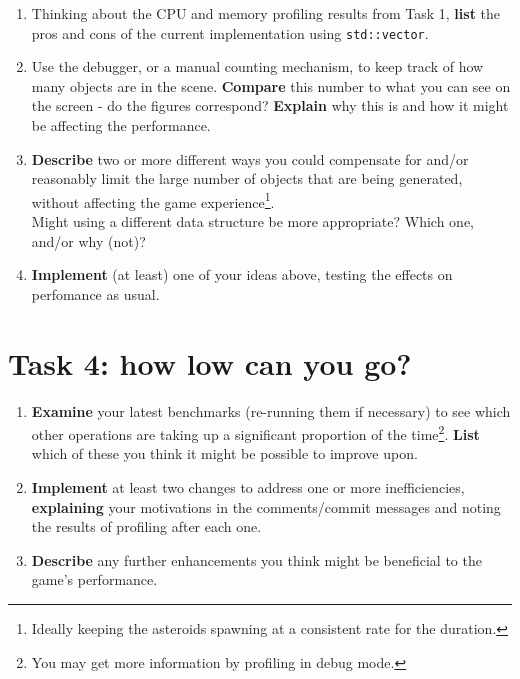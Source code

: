 \documentclass{../../../fal_assignment}
\begin{document}
\begin{enumerate}
	\item Thinking about the CPU and memory profiling results from Task 1, \textbf{list} the pros and cons of the current implementation using \lstinline{std::vector}.\\
	\item Use the debugger, or a manual counting mechanism, to keep track of how many objects are in the scene. \textbf{Compare} this number to what you can see on the screen - do the figures correspond? \textbf{Explain} why this is and how it might be affecting the performance.\\
	\item \textbf{Describe} two or more different ways you could compensate for and/or reasonably limit the large number of objects that are being generated, without affecting the game experience\footnote{Ideally keeping the asteroids spawning at a consistent rate for the duration.}.\\
Might using a different data structure be more appropriate? Which one, and/or why (not)?\\
	\item \textbf{Implement} (at least) one of your ideas above, testing the effects on perfomance as usual.
\end{enumerate}

\section*{Task 4: how low can you go?}

\begin{enumerate}
	\item \textbf{Examine} your latest benchmarks (re-running them if necessary) to see which other operations are taking up a significant proportion of the time\footnote{You may get more information by profiling in debug mode.}. \textbf{List} which of these you think it might be possible to improve upon.\\
	\item \textbf{Implement} at least two changes to address one or more inefficiencies, \textbf{explaining} your motivations in the comments/commit messages and noting the results of profiling after each one.\\
	\item \textbf{Describe} any further enhancements you think might be beneficial to the game's performance.
\end{enumerate}
\end{document}
